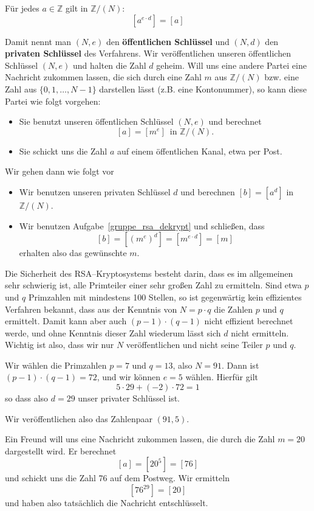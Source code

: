 \begin{aufgabe}\label{gruppe_rsa_dekrypt} Für jedes $a \in \mathbb Z$ gilt in $\mathbb Z/(N)$:
  	$$ [a^{e \cdot d}] = [a] $$
\end{aufgabe}

Damit nennt man $(N, e)$ den \textbf{öffentlichen Schlüssel} und $(N,d)$ den 
\textbf{privaten Schlüssel} 
des Verfahrens. Wir veröffentlichen unseren öffentlichen Schlüssel $(N, e)$ und halten die Zahl $d$ 
geheim. Will uns eine andere Partei eine Nachricht zukommen lassen, die sich durch eine Zahl $m$ aus 
$\mathbb Z/(N)$ bzw. eine Zahl aus $\{0, 1, \ldots, N-1\}$ darstellen lässt (z.B. eine Kontonummer), 
so kann diese Partei wie folgt vorgehen:

\begin{itemize}
\item Sie benutzt unseren öffentlichen Schlüssel $(N,e)$ und berechnet 
    	$$ [a] = [m^e] \, \textrm{ in } \mathbb Z/(N).$$
\item Sie schickt uns die Zahl $a$ auf einem öffentlichen Kanal, etwa per Post.
\end{itemize}

Wir gehen dann wie folgt vor

\begin{itemize} 
\item Wir benutzen unseren privaten Schlüssel $d$ und berechnen $[b] = [a^d]$ in  $\mathbb Z/(N)$.
\item Wir benutzen Aufgabe~\ref{gruppe_rsa_dekrypt} und schließen, dass 
   	$$[b] = [\left(m^e\right)^d] = [m^{e \cdot d}] = [m] $$
erhalten also das gewünschte $m$.
\end{itemize}

Die Sicherheit des RSA--Kryptosystems besteht darin, dass es im allgemeinen sehr schwierig ist, alle 
Primteiler einer sehr großen Zahl zu ermitteln. Sind etwa $p$ und $q$ Primzahlen mit mindestens 100 Stellen, so ist 
gegenwärtig kein effizientes Verfahren bekannt, dass aus der Kenntnis von $N = p \cdot q$ die Zahlen 
$p$ und $q$ ermittelt. Damit kann aber auch $(p-1) \cdot (q-1)$ nicht effizient berechnet werde, und ohne Kenntnis 
dieser Zahl wiederum lässt sich $d$ nicht ermitteln. Wichtig ist also, dass wir nur $N$ veröffentlichen 
und nicht seine Teiler $p$ und $q$. 

\begin{beispiel} Wir wählen die Primzahlen $p = 7$ und $q = 13$, also $N = 91$. Dann ist $(p-1) \cdot (q-1) 
= 72$, und wir können $e = 5$ wählen. Hierfür gilt
  	$$ 5 \cdot 29 + (-2) \cdot 72 = 1 $$
so dass also $d = 29$ unser privater Schlüssel ist.

Wir veröffentlichen also das Zahlenpaar $(91, 5)$.

Ein Freund will uns eine Nachricht zukommen lassen, die durch die Zahl $m = 20$ dargestellt wird. 
Er berechnet
  	$$ [a] = [20^5] = [76] $$
und schickt uns die Zahl 76 auf dem Postweg. Wir ermitteln 
  	$$ [76^{29}] = [20] $$
und haben also tatsächlich die Nachricht entschlüsselt.
\end{beispiel}

